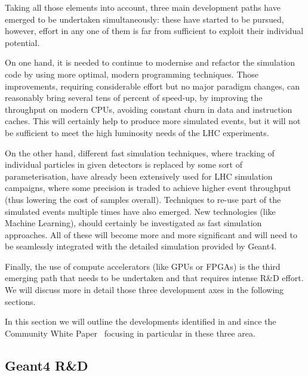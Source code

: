 \documentclass[11pt,a4paper]{article}
\begin{document}
Taking all those elements into account, three main development paths have emerged to be
undertaken simultaneously: these have started to be pursued, however,
effort in any one of them is far from sufficient to exploit their
individual potential. 

On one hand, it is needed to continue to modernise
and refactor the simulation code by using more optimal, modern
programming techniques. Those improvements, requiring considerable
effort but no major paradigm changes, can reasonably bring several tens
of percent of speed-up, by improving the throughput on modern CPUs,
avoiding constant churn in data and instruction caches. This will
certainly help to produce more simulated events, but it will not be
sufficient to meet the high luminosity needs of the LHC experiments. 

On the other hand, different fast simulation techniques, where tracking of
individual particles in given detectors is replaced by some sort of
parameterisation, have already been extensively used for LHC simulation
campaigns, where some precision is traded to achieve higher event
throughput (thus lowering the cost of samples overall). Techniques to
re-use part of the simulated events multiple times have also emerged.
New technologies (like Machine Learning), should certainly be
investigated as fast simulation approaches. All of these will become
more and more significant and will need to be seamlessly integrated with
the detailed simulation provided by Geant4. 

Finally, the use of compute
accelerators (like GPUs or FPGAs) is the third emerging path that needs
to be undertaken and that requires intense R\&D effort. We will discuss
more in detail those three development axes in the following sections.

In this section we will outline the developments identified in and since the
Community White Paper~\cite{Albrecht2019, SimFoundation2018hep} focusing
in particular in these three area. 

\hypertarget{geant4-rd}{%
\subsection{Geant4 R\&D}\label{geant4-rd}}
\end{document}
